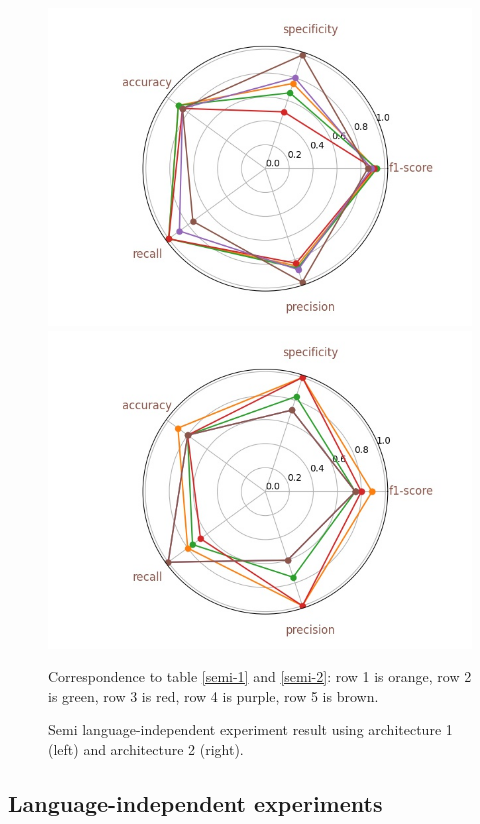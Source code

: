 \begin{figure}[t]
	\begin{center}
		\includegraphics[width=.49\linewidth]{figs/semi_radar.jpg}
		\includegraphics[width=.49\linewidth]{figs/semi_200_radar.jpg}
	\end{center}
	\caption{Semi language-independent experiment result using architecture 1 (left) and architecture 2 (right).} Correspondence to table \ref{semi-1} and \ref{semi-2}: row 1 is orange, row 2 is green, row 3 is red, row 4 is purple, row 5 is brown.
	\label{radar_semi}
\end{figure}

\subsection{Language-independent experiments}

